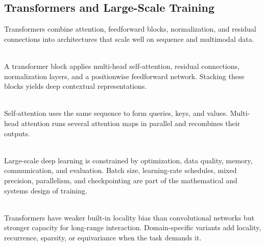 \subsection{Transformers and Large-Scale Training}

Transformers combine attention, feedforward blocks, normalization, and residual connections into architectures that scale well on sequence and multimodal data.

\begin{definition} \label{def:sl-transformer-block} \\
A transformer block applies multi-head self-attention, residual connections, normalization layers, and a positionwise feedforward network.  Stacking these blocks yields deep contextual representations.
\end{definition}

\begin{definition} \label{def:sl-self-attention} \\
Self-attention uses the same sequence to form queries, keys, and values.  Multi-head attention runs several attention maps in parallel and recombines their outputs.
\end{definition}

\begin{remark} \label{rem:sl-large-scale-training} \\
Large-scale deep learning is constrained by optimization, data quality, memory, communication, and evaluation.  Batch size, learning-rate schedules, mixed precision, parallelism, and checkpointing are part of the mathematical and systems design of training.
\end{remark}

\begin{remark} \label{rem:sl-transformer-generalization} \\
Transformers have weaker built-in locality bias than convolutional networks but stronger capacity for long-range interaction.  Domain-specific variants add locality, recurrence, sparsity, or equivariance when the task demands it.
\end{remark}
